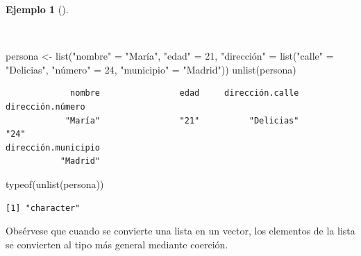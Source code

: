 \documentclass[
  spanish,
  a4paper,
]{scrreport}
\newenvironment{Shaded}{\begin{snugshade}}{\end{snugshade}}
\newcommand{\DecValTok}[1]{\textcolor[rgb]{0.68,0.00,0.00}{#1}}
\newcommand{\FunctionTok}[1]{\textcolor[rgb]{0.28,0.35,0.67}{#1}}
\newcommand{\NormalTok}[1]{\textcolor[rgb]{0.00,0.23,0.31}{#1}}
\newcommand{\OtherTok}[1]{\textcolor[rgb]{0.00,0.23,0.31}{#1}}
\newcommand{\StringTok}[1]{\textcolor[rgb]{0.13,0.47,0.30}{#1}}
\theoremstyle{definition}
\theoremstyle{definition}
\newtheorem{example}{Ejemplo}[chapter]
\theoremstyle{remark}
\begin{document}
\begin{example}[]\protect\hypertarget{exm-aplanar-lista}{}\label{exm-aplanar-lista}

~

\begin{Shaded}
\begin{Highlighting}[]
\NormalTok{persona }\OtherTok{\textless{}{-}} \FunctionTok{list}\NormalTok{(}\StringTok{"nombre"} \OtherTok{=} \StringTok{"María"}\NormalTok{, }\StringTok{"edad"} \OtherTok{=} \DecValTok{21}\NormalTok{, }\StringTok{"dirección"} \OtherTok{=} \FunctionTok{list}\NormalTok{(}\StringTok{"calle"} \OtherTok{=} \StringTok{"Delicias"}\NormalTok{, }\StringTok{"número"} \OtherTok{=} \DecValTok{24}\NormalTok{, }\StringTok{"municipio"} \OtherTok{=} \StringTok{"Madrid"}\NormalTok{))}
\FunctionTok{unlist}\NormalTok{(persona)}
\end{Highlighting}
\end{Shaded}

\begin{verbatim}
             nombre                edad     dirección.calle    dirección.número 
            "María"                "21"          "Delicias"                "24" 
dirección.municipio 
           "Madrid" 
\end{verbatim}

\begin{Shaded}
\begin{Highlighting}[]
\FunctionTok{typeof}\NormalTok{(}\FunctionTok{unlist}\NormalTok{(persona))}
\end{Highlighting}
\end{Shaded}

\begin{verbatim}
[1] "character"
\end{verbatim}

\end{example}

\begin{tcolorbox}[enhanced jigsaw, arc=.35mm, bottomrule=.15mm, bottomtitle=1mm, breakable, colback=white, colbacktitle=quarto-callout-warning-color!10!white, colframe=quarto-callout-warning-color-frame, coltitle=black, left=2mm, leftrule=.75mm, opacityback=0, opacitybacktitle=0.6, rightrule=.15mm, title=\textcolor{quarto-callout-warning-color}{\faExclamationTriangle}\hspace{0.5em}{Advertencia}, titlerule=0mm, toprule=.15mm, toptitle=1mm]

Obsérvese que cuando se convierte una lista en un vector, los elementos
de la lista se convierten al tipo más general mediante coerción.

\end{tcolorbox}
\end{document}
